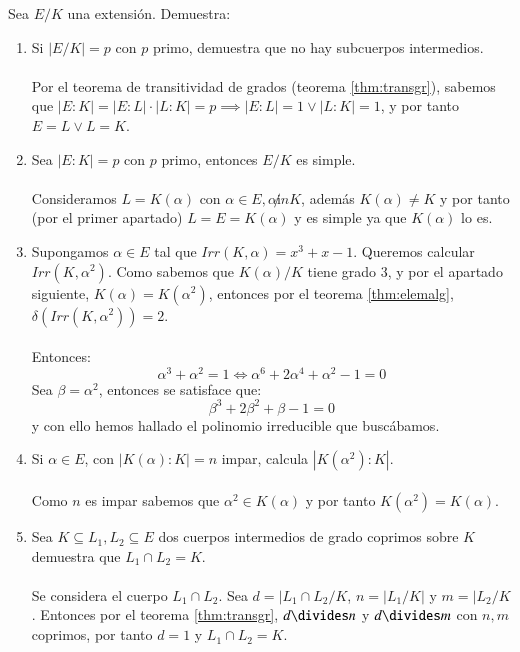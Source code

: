 \begin{ex}[H2.11]
    Sea $E/K$ una extensión. Demuestra:
    \begin{enumerate}
        \item Si $|E/K| = p$ con $p$ primo, demuestra que no hay subcuerpos intermedios.\\\\
        Por el teorema de transitividad de grados (teorema \ref{thm:transgr}), sabemos que $|E:K| = |E:L| \cdot |L:K| = p \implies |E:L| = 1 \lor |L:K| = 1$, y por tanto $E = L \lor L = K$.

        \item Sea $|E:K| = p$ con $p$ primo, entonces $E/K$ es simple.\\\\
        Consideramos $L = K(\alpha)$ con $\alpha \in E, \alpha \not in K$, además $K(\alpha) \neq K$ y por tanto (por el primer apartado) $L = E = K(\alpha)$ y es simple ya que $K(\alpha)$ lo es.

        \item Supongamos $\alpha \in E$ tal que $Irr(K, \alpha) = x^3 + x - 1$. Queremos calcular $Irr(K, \alpha^2)$. Como sabemos que $K(\alpha)/K$ tiene grado $3$, y por el apartado siguiente, $K(\alpha) = K(\alpha^2)$, entonces por el teorema \ref{thm:elemalg}, $\delta(Irr(K, \alpha^2))=2$.\\\\
        Entonces:
        $$
            \alpha^3 + \alpha^2 = 1 \iff \alpha^6 + 2\alpha^4 + \alpha^2 - 1 = 0
        $$
        Sea $\beta = \alpha^2$, entonces se satisface que:
        $$
            \beta^3 + 2\beta^2 + \beta - 1 = 0
        $$
        y con ello hemos hallado el polinomio irreducible que buscábamos.

        \item Si $\alpha \in E$, con $|K(\alpha):K| = n$ impar, calcula $|K(\alpha^2):K|$.\\\\
        Como $n$ es impar sabemos que $\alpha^2 \in K(\alpha)$ y por tanto $K(\alpha^2) = K(\alpha)$.\\

        \item Sea $K \subseteq L_1, L_2 \subseteq E$ dos cuerpos intermedios de grado coprimos sobre $K$ demuestra que $L_1 \cap L_2 = K$.\\\\
        Se considera el cuerpo $L_1 \cap L_2$. Sea $d = |L_1 \cap L_2 / K$, $n = |L_1/K|$ y $m=|L_2/K$. Entonces por el teorema \ref{thm:transgr}, $d \divides n$ y $d \divides m$ con $n, m$ coprimos, por tanto $d = 1$ y $L_1 \cap L_2 = K$.
    \end{enumerate}
\end{ex}

